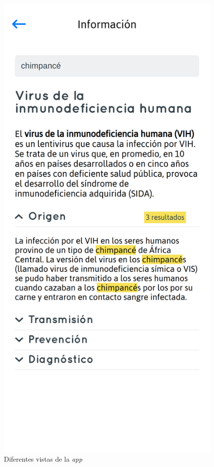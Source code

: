 \begin{figure}[htbp]
\includegraphics[scale=0.10]{../images/app_3.png}
\caption{Diferentes vistas de la \textit{app}}
\label{fig:vistas}
\end{figure}


